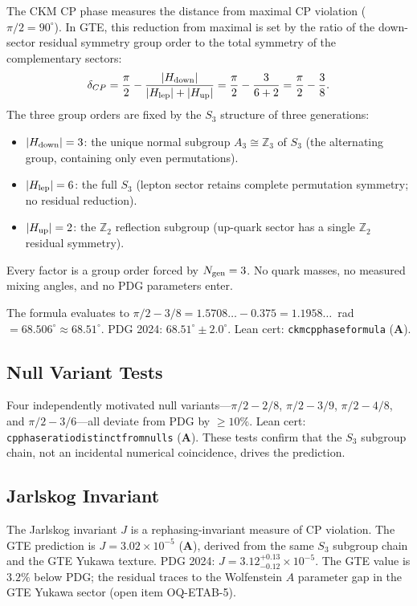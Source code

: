 \documentclass[11pt,openany]{book}
\theoremstyle{remark}
\newcommand{\lean}[1]{%
  \penalty-100
  \begingroup\def\_{\textunderscore\allowbreak}\texttt{#1}\endgroup}
\newcommand{\CatA}{\textbf{A}}
\begin{document}
The CKM CP phase measures the distance from maximal CP violation ($\pi/2 = 90^\circ$).
In GTE, this reduction from maximal is set by the ratio of the down-sector residual
symmetry group order to the total symmetry of the complementary sectors:
\begin{equation}
  \delta_{CP}
  = \frac{\pi}{2}
    - \frac{|H_{\rm down}|}{|H_{\rm lep}| + |H_{\rm up}|}
  = \frac{\pi}{2} - \frac{3}{6 + 2}
  = \frac{\pi}{2} - \frac{3}{8}.
\label{eq:delta_ckm}
\end{equation}
The three group orders are fixed by the $S_3$ structure of three generations:
\begin{itemize}
\item $|H_{\rm down}| = 3$: the unique normal subgroup $A_3 \cong \mathbb{Z}_3$ of $S_3$
  (the alternating group, containing only even permutations).
\item $|H_{\rm lep}| = 6$: the full $S_3$ (lepton sector retains complete permutation
  symmetry; no residual reduction).
\item $|H_{\rm up}| = 2$: the $\mathbb{Z}_2$ reflection subgroup (up-quark sector
  has a single $\mathbb{Z}_2$ residual symmetry).
\end{itemize}
Every factor is a group order forced by $N_{\rm gen} = 3$.
No quark masses, no measured mixing angles, and no PDG parameters enter.

The formula evaluates to $\pi/2 - 3/8 = 1.5708\ldots - 0.375 = 1.1958\ldots$~rad
$= 68.506^\circ \approx 68.51^\circ$.
PDG 2024: $68.51^\circ \pm 2.0^\circ$.
Lean cert: \lean{ckm\_cp\_phase\_formula} (\CatA).

\subsection*{Null Variant Tests}

Four independently motivated null variants---$\pi/2 - 2/8$, $\pi/2 - 3/9$,
$\pi/2 - 4/8$, and $\pi/2 - 3/6$---all deviate from PDG by $\geq 10\%$.
Lean cert: \lean{cp\_phase\_ratio\_distinct\_from\_nulls} (\CatA).
These tests confirm that the $S_3$ subgroup chain, not an incidental numerical
coincidence, drives the prediction.

\subsection*{Jarlskog Invariant}

The Jarlskog invariant $J$ is a rephasing-invariant measure of CP violation.
The GTE prediction is $J = 3.02 \times 10^{-5}$ (\CatA),
derived from the same $S_3$ subgroup chain and the GTE Yukawa texture.
PDG 2024: $J = 3.12^{+0.13}_{-0.12} \times 10^{-5}$.
The GTE value is $3.2\%$ below PDG; the residual traces to the Wolfenstein $A$
parameter gap in the GTE Yukawa sector (open item OQ-ETAB-5).
\end{document}
